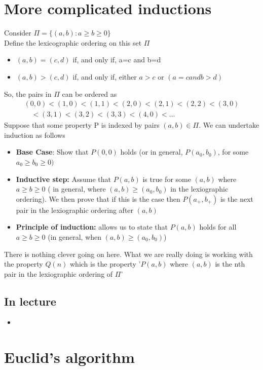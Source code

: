 \documentclass{article}[18pt]
\begin{document}
\section{More complicated inductions}
Consider $\Pi =\{(a,b): a\geqslant b\geqslant 0\}$\\
Define the lexicographic ordering on this set $\Pi$
\begin{itemize}
	\item $(a,b)=(c,d)$ if, and only if, a=c and b=d
	\item $(a,b)>(c,d)$ if, and only if, either $a>c$ or $(a=c and b>d)$
\end{itemize}
So, the pairs in $\Pi$ can be ordered as
$$\begin{array} { l } { ( 0,0 ) < ( 1,0 ) < ( 1,1 ) < ( 2,0 ) < ( 2,1 ) < ( 2,2 ) < ( 3,0 ) } \\ { \quad < ( 3,1 ) < ( 3,2 ) < ( 3,3 ) < ( 4,0 ) < \ldots } \end{array}$$
Suppose that some property P is indexed by pairs $(a,b)\in \Pi$. We can undertake induction as follows
\begin{itemize}
	\item \textbf{Base Case}: Show that $P(0,0)$ holds (or in general, $P(a_0,b_0)$, for some $a_0\geqslant b_0\geqslant 0)$
	\item \textbf{Inductive step:} Assume that $P(a,b)$ is true for some $(a,b)$ where $a\geqslant b\geqslant 0$ ( in general, where $(a,b)\geqslant (a_0,b_0)$ in the lexiographic ordering). We then prove that if this is the case then $P(a_+,b_+)$ is the next pair in the lexiographic ordering after $(a,b)$
	\item \textbf{Principle of induction:} allows us to state that $P(a,b)$ holds for all $a\geqslant b\geqslant 0$ (in general, when $(a,b)\geqslant (a_0,b_0)$) 
\end{itemize}
There is nothing clever going on here. What we are really doing is working with the property $Q(n)$ which is the property '$P(a,b)$ where $(a,b)$ is the nth pair in the lexiographic ordering of $\Pi$'
\subsection{In lecture}
\begin{itemize}
	\item 
\end{itemize}




\section{Euclid's algorithm}
\end{document}
